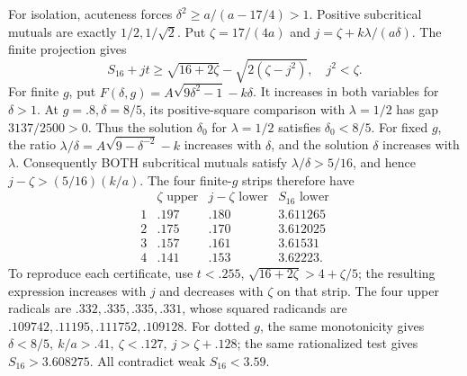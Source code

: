\documentclass[11pt]{article}
\theoremstyle{definition}
\theoremstyle{remark}
\begin{document}
For isolation, acuteness forces
\(\delta^2\geq a/(a-17/4)>1\).
Positive subcritical mutuals are exactly \(1/2,1/\sqrt2\).
Put \(\zeta=17/(4a)\) and
\(j=\zeta+k\lambda/(a\delta)\).
The finite projection gives
\[
 S_{16}+jt\geq\sqrt{16+2\zeta}-\sqrt{2(\zeta-j^2)},\quad j^2<\zeta .
\]
For finite \(g\), put
\(F(\delta,g)=A\sqrt{9\delta^2-1}-k\delta\).
It increases in both variables for \(\delta>1\).
At \(g=.8,\delta=8/5\), its positive-square comparison with
\(\lambda=1/2\) has gap \(3137/2500>0\).
Thus the solution \(\delta_0\) for \(\lambda=1/2\) satisfies
\(\delta_0<8/5\).
For fixed \(g\), the ratio
\(\lambda/\delta=A\sqrt{9-\delta^{-2}}-k\)
increases with \(\delta\), and the solution \(\delta\)
increases with \(\lambda\).
Consequently BOTH subcritical mutuals satisfy
\(\lambda/\delta>5/16\), and hence
\(j-\zeta>(5/16)(k/a)\).
The four finite-\(g\) strips therefore have
\[
\begin{array}{c|c|c|c}
 &\zeta\text{ upper}&j-\zeta\text{ lower}&S_{16}\text{ lower}\\ \hline
1&.197&.180&3.611265\\
2&.175&.170&3.612025\\
3&.157&.161&3.61531\\
4&.141&.153&3.62223 .
\end{array}
\]
To reproduce each certificate, use \(t<.255\),
\(\sqrt{16+2\zeta}>4+\zeta/5\);
the resulting expression increases with \(j\) and decreases with
\(\zeta\) on that strip.
The four upper radicals are \(.332,.335,.335,.331\),
whose squared radicands are
\(.109742,.11195,.111752,.109128\).
For dotted \(g\), the same monotonicity gives
\(\delta<8/5,\ k/a>.41,\ \zeta<.127,\ j>\zeta+.128\);
the same rationalized test gives \(S_{16}>3.608275\).
All contradict weak \(S_{16}<3.59\).
\end{document}
